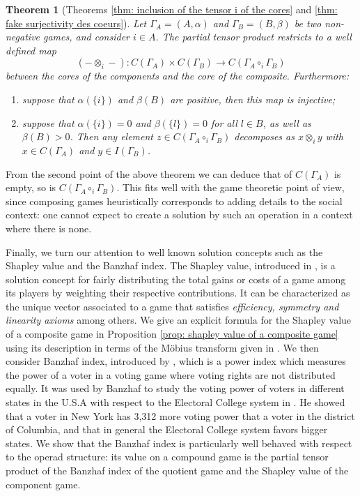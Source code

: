 \documentclass[a4paper,12pt]{amsart}
\newtheorem{theoremintro}{Theorem}
\begin{document}
\begin{theoremintro}[Theorems \ref{thm: inclusion of the tensor i of the cores} and \ref{thm: fake surjectivity des coeurs}]
Let \(\Gamma_A = (A, \alpha)\) and \(\Gamma_B = (B, \beta)\) be two non-negative games, and consider \(i \in A\). The partial tensor product restricts to a well defined map
    \[
    (- \otimes_i -): C(\Gamma_A) \times C(\Gamma_B) \longrightarrow C(\Gamma_A \circ_i \Gamma_B)
    \]
between the cores of the components and the core of the composite. Furthermore: 

\medskip

\begin{enumerate}
    \item suppose that $\alpha(\{i\})$ and $\beta(B)$ are positive, then this map is injective;

\medskip

    \item suppose that $\alpha(\{i\}) = 0$ and \(\beta(\{l\}) = 0\) for all \(l \in B\),  as well as $\beta(B) > 0$. Then any element $z \in C(\Gamma_A \circ_i \Gamma_B)$ decomposes as $x \otimes_i y$ with $x \in C(\Gamma_A)$ and $y \in I(\Gamma_B)$.
\end{enumerate}
\end{theoremintro}

From the second point of the above theorem we can deduce that of $C(\Gamma_A)$ is empty, so is $C(\Gamma_A \circ_i \Gamma_B).$ This fits well with the game theoretic point of view, since composing games heuristically corresponds to adding details to the social context: one cannot expect to create a solution by such an operation in a context where there is none. 

\medskip

Finally, we turn our attention to well known solution concepts such as the Shapley value and the Banzhaf index. The Shapley value, introduced in \cite{Shapley1953}, is a solution concept for fairly distributing the total gains or costs of a game among its players by weighting their respective contributions. It can be characterized as the unique vector associated to a game that satisfies \textit{efficiency, symmetry and linearity axioms} among others. We give an explicit formula for the Shapley value of a composite game in Proposition \ref{prop: shapley value of a composite game} using its description in terms of the Möbius transform given in \cite{harsanyi1958bargaining}. We then consider Banzhaf index, introduced by \cite{Penrose}, which is a power index which measures the power of a voter in a voting game where voting rights are not distributed equally. It was used by Banzhaf to study the voting power of voters in different states in the U.S.A with respect to the Electoral College system in \cite{banzhaf1968one}. He showed that a voter in New York has 3,312 more voting power that a voter in the district of Columbia, and that in general the Electoral College system favors bigger states. We show that the Banzhaf index is particularly well behaved with respect to the operad structure: its value on a compound game is the partial tensor product of the Banzhaf index of the quotient game and the Shapley value of the component game. 
\end{document}

